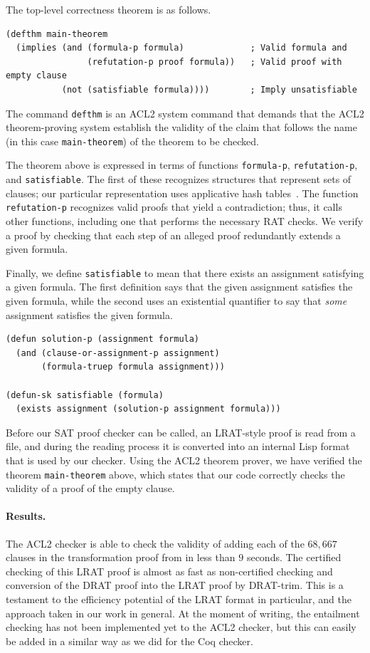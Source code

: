 \documentclass{article}
\begin{document}
The top-level correctness theorem is as follows.
\begin{verbatim}
(defthm main-theorem
  (implies (and (formula-p formula)             ; Valid formula and
                (refutation-p proof formula))   ; Valid proof with empty clause
           (not (satisfiable formula))))        ; Imply unsatisfiable
\end{verbatim}
The command {\tt defthm} is an ACL2 system command that demands that
the ACL2 theorem-proving system establish the validity of the claim
that follows the name (in this case {\tt main-theorem}) of the theorem
to be checked.

The theorem above is expressed in terms of functions {\tt formula-p},
{\tt refutation-p}, and {\tt satisfiable}.  The first of these
recognizes structures that represent sets of clauses; our particular
%
%
%
%
representation uses applicative hash tables~\cite{fast-alists}.
The function {\tt refutation-p} recognizes valid proofs that yield a
contradiction; thus, it calls other functions, including one that
performs the necessary RAT checks.  We verify a proof by checking that
each step of an alleged proof redundantly extends a given formula.

Finally, we define {\tt satisfiable} to mean that there exists an
assignment satisfying a given formula.  The first definition says that
the given assignment satisfies the given formula, while the second
uses an existential quantifier to say that {\em some} assignment
satisfies the given formula.
\begin{verbatim}
(defun solution-p (assignment formula)
  (and (clause-or-assignment-p assignment)
       (formula-truep formula assignment)))

(defun-sk satisfiable (formula)
  (exists assignment (solution-p assignment formula)))
\end{verbatim}

Before our SAT proof checker can be called, an LRAT-style proof is
read from a file, and during the reading process it is converted into
an internal Lisp format that is used by our checker.  Using the ACL2
theorem prover, we have verified the theorem {\tt main-theorem} above,
which states that our code correctly checks the validity of a proof of
the empty clause.

\paragraph{Results.}
The ACL2 checker %
%
is able to check the validity of adding each of the $68{,}667$ clauses in the transformation
proof from \cite{heule-sat16a}
in less than $9$ seconds. The certified checking of this LRAT proof is almost as
fast as non-certified checking and conversion of the DRAT proof into the LRAT proof
by DRAT-trim. This is a testament to the efficiency potential of the LRAT
format in particular, and the approach taken in our work in general. At the moment 
of writing, the entailment checking has not been implemented yet to the ACL2 
checker, but this can easily be added in a similar way as we did for the Coq checker.
\end{document}
